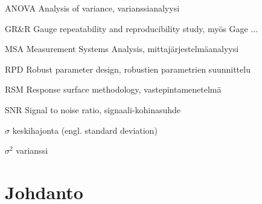 \documentclass[12pt,a4paper,finnish]{tutthesis}
\begin{document}
\begin{termlist}
\item [ANOVA]      Analysis of variance, varianssianalyysi
\item [GR\&R] 	   Gauge repeatability and reproducibility study, myös Gage ...
\item [MSA]        Measurement Systems Analysis, mittajärjestelmäanalyysi
\item [RPD]        Robust parameter design, robustien parametrien suunnittelu
\item [RSM]        Response surface methodology, vastepintamenetelmä
\item [SNR]        Signal to noise ratio, signaali-kohinasuhde
\end{termlist} 

\begin{termlist}
\item [$\sigma$] keskihajonta (engl. standard deviation)
\item [$\sigma^2$] varianssi
\end{termlist} 



\cleardoublepage

\newpage             %
\setcounter{page}{1} %
\renewcommand{\chaptername}{} %
\chapter{Johdanto}
\label{ch:johdanto} 

\end{document}
